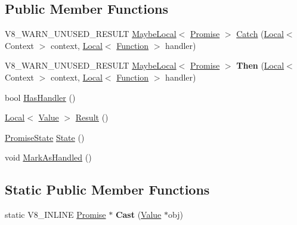 \subsection*{Public Member Functions}
\begin{DoxyCompactItemize}
\item 
V8\+\_\+\+W\+A\+R\+N\+\_\+\+U\+N\+U\+S\+E\+D\+\_\+\+R\+E\+S\+U\+LT \mbox{\hyperlink{classv8_1_1MaybeLocal}{Maybe\+Local}}$<$ \mbox{\hyperlink{classv8_1_1Promise}{Promise}} $>$ \mbox{\hyperlink{classv8_1_1Promise_ab5b9bc0140b750cbf569f3a0e6c92b42}{Catch}} (\mbox{\hyperlink{classv8_1_1Local}{Local}}$<$ Context $>$ context, \mbox{\hyperlink{classv8_1_1Local}{Local}}$<$ \mbox{\hyperlink{classv8_1_1Function}{Function}} $>$ handler)
\item 
\mbox{\label{classv8_1_1Promise_af043d82818e1bbaf6c659e40bcf86c89}} 
V8\+\_\+\+W\+A\+R\+N\+\_\+\+U\+N\+U\+S\+E\+D\+\_\+\+R\+E\+S\+U\+LT \mbox{\hyperlink{classv8_1_1MaybeLocal}{Maybe\+Local}}$<$ \mbox{\hyperlink{classv8_1_1Promise}{Promise}} $>$ {\bfseries Then} (\mbox{\hyperlink{classv8_1_1Local}{Local}}$<$ Context $>$ context, \mbox{\hyperlink{classv8_1_1Local}{Local}}$<$ \mbox{\hyperlink{classv8_1_1Function}{Function}} $>$ handler)
\item 
bool \mbox{\hyperlink{classv8_1_1Promise_aeea8bdfdbe2291632d7f0d45394c1722}{Has\+Handler}} ()
\item 
\mbox{\hyperlink{classv8_1_1Local}{Local}}$<$ \mbox{\hyperlink{classv8_1_1Value}{Value}} $>$ \mbox{\hyperlink{classv8_1_1Promise_a94aceab6e2ad55f37e6997b4dcac2f11}{Result}} ()
\item 
\mbox{\hyperlink{classv8_1_1Promise_a0c357b9d99a634f98a5a203b0a322544}{Promise\+State}} \mbox{\hyperlink{classv8_1_1Promise_abc011691f131e23939b167a4fe3f9391}{State}} ()
\item 
void \mbox{\hyperlink{classv8_1_1Promise_a17d6e3484dc051e1c05a31fd285b0f9f}{Mark\+As\+Handled}} ()
\end{DoxyCompactItemize}
\subsection*{Static Public Member Functions}
\begin{DoxyCompactItemize}
\item 
\mbox{\label{classv8_1_1Promise_adfa3b953beb2678dd3b5d6ddb3f0746d}} 
static V8\+\_\+\+I\+N\+L\+I\+NE \mbox{\hyperlink{classv8_1_1Promise}{Promise}} $\ast$ {\bfseries Cast} (\mbox{\hyperlink{classv8_1_1Value}{Value}} $\ast$obj)
\end{DoxyCompactItemize}
